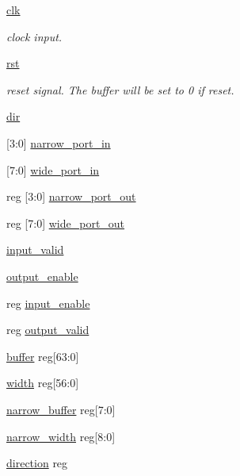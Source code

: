 \begin{DoxyCompactItemize}
\item 
\mbox{\hyperlink{enumfifo_ae0fe05859d03589d61cf0f69de9e7678}{clk}}
\begin{DoxyCompactList}\small\item\em clock input. \end{DoxyCompactList}\item 
\mbox{\hyperlink{enumfifo_a1cb4b0e761fcf0e2e1ff541d6af4ebad}{rst}}
\begin{DoxyCompactList}\small\item\em reset signal. The buffer will be set to 0 if reset. \end{DoxyCompactList}\item 
\mbox{\hyperlink{enumfifo_aaf4a37103205f6662b0a1d80a738adaa}{dir}}
\item 
\mbox{[}3\+:0\mbox{]} \mbox{\hyperlink{enumfifo_a0a60ca7138c275b0b4c6a99507b7f32b}{narrow\+\_\+port\+\_\+in}}
\item 
\mbox{[}7\+:0\mbox{]} \mbox{\hyperlink{enumfifo_afab6f412623dc4c22e9d8c6b98e847cd}{wide\+\_\+port\+\_\+in}}
\item 
reg \mbox{[}3\+:0\mbox{]} \mbox{\hyperlink{enumfifo_a94b95e7c8f83e2e7cb9865753d6bca50}{narrow\+\_\+port\+\_\+out}}
\item 
reg \mbox{[}7\+:0\mbox{]} \mbox{\hyperlink{enumfifo_aff07e3889d449c2cca44d3664a02aeaf}{wide\+\_\+port\+\_\+out}}
\item 
\mbox{\hyperlink{enumfifo_acfb9a73a88276cd8a16a0e77559171fc}{input\+\_\+valid}}
\item 
\mbox{\hyperlink{enumfifo_a2e34684dc888205692d0a1f9d4fbda76}{output\+\_\+enable}}
\item 
reg \mbox{\hyperlink{enumfifo_a6bbf9dd197f6264d333fe0505d8521eb}{input\+\_\+enable}}
\item 
reg \mbox{\hyperlink{enumfifo_a02360b908c47c6b5102e9597db8f51cb}{output\+\_\+valid}}
\item 
\mbox{\hyperlink{enumfifo_a5cb2b13451613d2af01db68febec6a50}{buffer}} reg\mbox{[}63\+:0\mbox{]}
\item 
\mbox{\hyperlink{enumfifo_aa0ade2ed497f56192af48cb015110e95}{width}} reg\mbox{[}56\+:0\mbox{]}
\item 
\mbox{\hyperlink{enumfifo_a5d5518c101413e893e36eb82384320c9}{narrow\+\_\+buffer}} reg\mbox{[}7\+:0\mbox{]}
\item 
\mbox{\hyperlink{enumfifo_a90a724159aa5f99c09e368ba5ed5f295}{narrow\+\_\+width}} reg\mbox{[}8\+:0\mbox{]}
\item 
\mbox{\hyperlink{enumfifo_a45c919098335b7a3b1089494455d9fcb}{direction}} reg
\end{DoxyCompactItemize}


